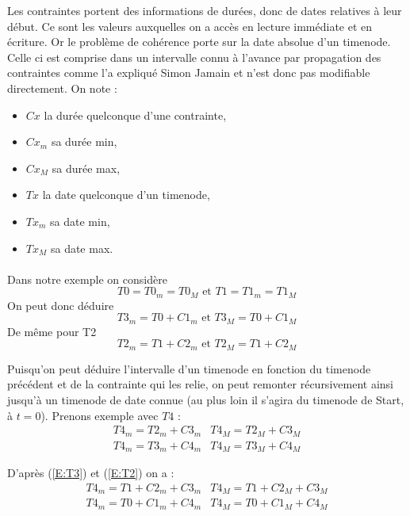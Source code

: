 \documentclass[10pt,a4paper]{article}
\begin{document}
Les contraintes portent des informations de durées, donc de dates relatives à leur début. Ce sont les valeurs auxquelles on a accès en lecture immédiate et en écriture. Or le problème de cohérence porte sur la date absolue d'un timenode. Celle ci est comprise dans un intervalle connu à l'avance par propagation des contraintes comme l'a expliqué Simon Jamain %
et n'est donc pas modifiable directement. On note : 
	\begin{itemize}
		\item $Cx$ la durée quelconque d'une contrainte,
		\item $Cx_m$ sa durée min,
		\item $Cx_M$ sa durée max,
		\item $Tx$ la date quelconque d'un timenode,
		\item $Tx_m$ sa date min,
		\item $Tx_M$ sa date max.
	\end{itemize}

\paragraph*{}
Dans notre exemple on considère \begin{equation} T0 = T0_m = T0_M \text{ et } T1 = T1_m = T1_M \end{equation}
On peut donc déduire \begin{equation}T3_m = T0 + C1_m \text{ et } T3_M = T0 + C1_M \label{E:T3}\end{equation}
De même pour T2 \begin{equation}T2_m = T1 + C2_m \text{ et } T2_M = T1 + C2_M \label{E:T2} \end{equation}

Puisqu'on peut déduire l'intervalle d'un timenode en fonction du timenode précédent et de la contrainte qui les relie, on peut remonter récursivement ainsi jusqu'à un timenode de date connue (au plus loin il s'agira du timenode de Start, à $t=0$). Prenons exemple avec $T4$ : 
	\begin{eqnarray} 
		T4_m = T2_m + C3_m & T4_M = T2_M + C3_M \\
		T4_m = T3_m + C4_m & T4_M = T3_M + C4_M \nonumber
		\label{E:coherence}
	\end{eqnarray}

D'après (\ref{E:T3}) et (\ref{E:T2}) on a :
	\begin{eqnarray} 
		T4_m = T1 + C2_m + C3_m &
		T4_M = T1 + C2_M + C3_M \\
		T4_m = T0 + C1_m + C4_m &
		T4_M = T0 + C1_M + C4_M \nonumber
		\label{E:conjonction}
	\end{eqnarray}
\end{document}
